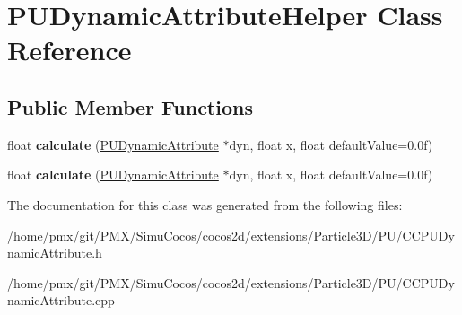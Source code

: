 \hypertarget{classPUDynamicAttributeHelper}{}\section{P\+U\+Dynamic\+Attribute\+Helper Class Reference}
\label{classPUDynamicAttributeHelper}
\subsection*{Public Member Functions}
\begin{DoxyCompactItemize}
\item 
\mbox{\label{classPUDynamicAttributeHelper_a23f6783a786df7f3d1a803d9438730d0}} 
float {\bfseries calculate} (\hyperlink{classPUDynamicAttribute}{P\+U\+Dynamic\+Attribute} $\ast$dyn, float x, float default\+Value=0.\+0f)
\item 
\mbox{\label{classPUDynamicAttributeHelper_a23f6783a786df7f3d1a803d9438730d0}} 
float {\bfseries calculate} (\hyperlink{classPUDynamicAttribute}{P\+U\+Dynamic\+Attribute} $\ast$dyn, float x, float default\+Value=0.\+0f)
\end{DoxyCompactItemize}


The documentation for this class was generated from the following files\+:\begin{DoxyCompactItemize}
\item 
/home/pmx/git/\+P\+M\+X/\+Simu\+Cocos/cocos2d/extensions/\+Particle3\+D/\+P\+U/C\+C\+P\+U\+Dynamic\+Attribute.\+h\item 
/home/pmx/git/\+P\+M\+X/\+Simu\+Cocos/cocos2d/extensions/\+Particle3\+D/\+P\+U/C\+C\+P\+U\+Dynamic\+Attribute.\+cpp\end{DoxyCompactItemize}

